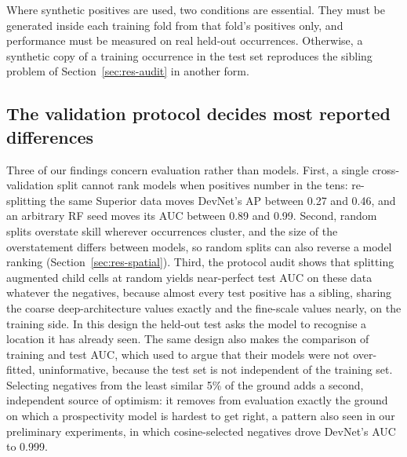 \documentclass[pdflatex,sn-apa]{sn-jnl}
\begin{document}
Where synthetic positives are used, two conditions are essential. They must be generated inside each training fold from that fold's positives only, and performance must be measured on real held-out occurrences. Otherwise, a synthetic copy of a training occurrence in the test set reproduces the sibling problem of Section~\ref{sec:res-audit} in another form.

\subsection{The validation protocol decides most reported differences}\label{sec:disc-protocol}

Three of our findings concern evaluation rather than models. First, a single cross-validation split cannot rank models when positives number in the tens: re-splitting the same Superior data moves DevNet's AP between 0.27 and 0.46, and an arbitrary RF seed moves its AUC between 0.89 and 0.99. Second, random splits overstate skill wherever occurrences cluster, and the size of the overstatement differs between models, so random splits can also reverse a model ranking (Section~\ref{sec:res-spatial}). Third, the protocol audit shows that splitting augmented child cells at random yields near-perfect test AUC on these data whatever the negatives, because almost every test positive has a sibling, sharing the coarse deep-architecture values exactly and the fine-scale values nearly, on the training side. In this design the held-out test asks the model to recognise a location it has already seen. The same design also makes the comparison of training and test AUC, which \citet{Parsa2024} used to argue that their models were not over-fitted, uninformative, because the test set is not independent of the training set. Selecting negatives from the least similar 5\% of the ground adds a second, independent source of optimism: it removes from evaluation exactly the ground on which a prospectivity model is hardest to get right, a pattern also seen in our preliminary experiments, in which cosine-selected negatives drove DevNet's AUC to 0.999.
\end{document}
